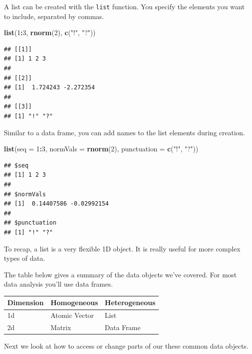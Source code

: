 \documentclass[
]{book}
\newenvironment{Shaded}{\begin{snugshade}}{\end{snugshade}}
\newcommand{\DataTypeTok}[1]{\textcolor[rgb]{0.13,0.29,0.53}{#1}}
\newcommand{\DecValTok}[1]{\textcolor[rgb]{0.00,0.00,0.81}{#1}}
\newcommand{\KeywordTok}[1]{\textcolor[rgb]{0.13,0.29,0.53}{\textbf{#1}}}
\newcommand{\NormalTok}[1]{#1}
\newcommand{\OperatorTok}[1]{\textcolor[rgb]{0.81,0.36,0.00}{\textbf{#1}}}
\newcommand{\StringTok}[1]{\textcolor[rgb]{0.31,0.60,0.02}{#1}}
\theoremstyle{definition}
\theoremstyle{definition}
\theoremstyle{definition}
\theoremstyle{remark}
\begin{document}
A list can be created with the \texttt{list} function. You specify the elements you want to include, separated by commas.

\begin{Shaded}
\begin{Highlighting}[]
\KeywordTok{list}\NormalTok{(}\DecValTok{1}\OperatorTok{:}\DecValTok{3}\NormalTok{, }\KeywordTok{rnorm}\NormalTok{(}\DecValTok{2}\NormalTok{), }\KeywordTok{c}\NormalTok{(}\StringTok{"!"}\NormalTok{, }\StringTok{"?"}\NormalTok{))}
\end{Highlighting}
\end{Shaded}

\begin{verbatim}
## [[1]]
## [1] 1 2 3
## 
## [[2]]
## [1]  1.724243 -2.272354
## 
## [[3]]
## [1] "!" "?"
\end{verbatim}

Similar to a data frame, you can add names to the list elements during creation.

\begin{Shaded}
\begin{Highlighting}[]
\KeywordTok{list}\NormalTok{(}\DataTypeTok{seq =} \DecValTok{1}\OperatorTok{:}\DecValTok{3}\NormalTok{, }\DataTypeTok{normVals =} \KeywordTok{rnorm}\NormalTok{(}\DecValTok{2}\NormalTok{), }\DataTypeTok{punctuation =} \KeywordTok{c}\NormalTok{(}\StringTok{"!"}\NormalTok{, }\StringTok{"?"}\NormalTok{))}
\end{Highlighting}
\end{Shaded}

\begin{verbatim}
## $seq
## [1] 1 2 3
## 
## $normVals
## [1]  0.14407586 -0.02992154
## 
## $punctuation
## [1] "!" "?"
\end{verbatim}

To recap, a list is a very flexible 1D object. It is really useful for more complex types of data.

The table below gives a summary of the data objects we've covered. For most data analysis you'll use data frames.

\begin{longtable}[]{@{}lll@{}}
\toprule
Dimension & Homogeneous & Heterogeneous\tabularnewline
\midrule
\endhead
1d & Atomic Vector & List\tabularnewline
2d & Matrix & Data Frame\tabularnewline
\bottomrule
\end{longtable}

Next we look at how to access or change parts of our these common data objects.
\end{document}
